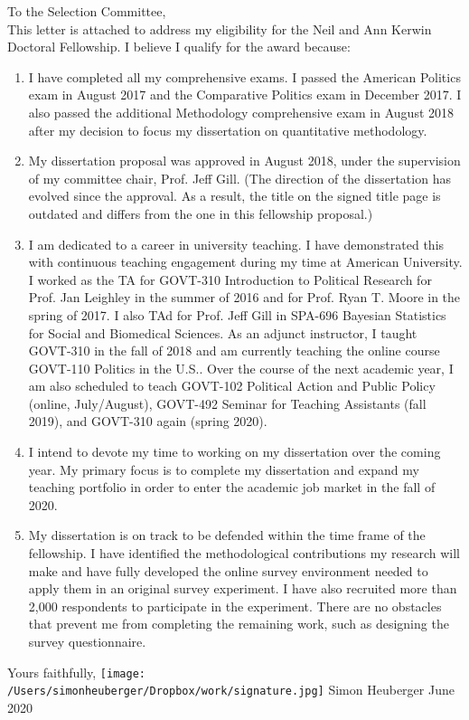



\noindent To the Selection Committee, \\

This letter is attached to address my eligibility for the Neil and Ann Kerwin Doctoral Fellowship. I believe I qualify for the award because:

\begin{enumerate}
	\item I have completed all my comprehensive exams. I passed the American Politics exam in August 2017 and the Comparative Politics exam in December 2017. I also passed the additional Methodology comprehensive exam in August 2018 after my decision to focus my dissertation on quantitative methodology.
	\item My dissertation proposal was approved in August 2018, under the supervision of my committee chair, Prof. Jeff Gill. (The direction of the dissertation has evolved since the approval. As a result, the title on the signed title page is outdated and differs from the one in this fellowship proposal.)
	\item I am dedicated to a career in university teaching. I have demonstrated this with continuous teaching engagement during my time at American University. I worked as the TA for GOVT-310 Introduction to Political Research for Prof. Jan Leighley in the summer of 2016 and for Prof. Ryan T. Moore in the spring of 2017. I also TAd for Prof. Jeff Gill in SPA-696 Bayesian Statistics for Social and Biomedical Sciences. As an adjunct instructor, I taught GOVT-310 in the fall of 2018 and am currently teaching the online course GOVT-110 Politics in the U.S.. Over the course of the next academic year, I am also scheduled to teach GOVT-102 Political Action and Public Policy (online, July/August), GOVT-492 Seminar for Teaching Assistants (fall 2019), and GOVT-310 again (spring 2020).
	\item I intend to devote my time to working on my dissertation over the coming year. My primary focus is to complete my dissertation and expand my teaching portfolio in order to enter the academic job market in the fall of 2020.
	\item My dissertation is on track to be defended within the time frame of the fellowship. I have identified the methodological contributions my research will make and have fully developed the online survey environment needed to apply them in an original survey experiment. I have also recruited more than 2,000 respondents to participate in the experiment. There are no obstacles that prevent me from completing the remaining work, such as designing the survey questionnaire.
\end{enumerate}

\noindent Yours faithfully, 
\newline \newline \texttt{[image: /Users/simonheuberger/Dropbox/work/signature.jpg]}
\newline Simon Heuberger
\newline June 2020












